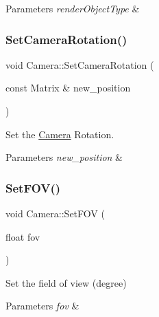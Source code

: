 \begin{DoxyParams}{Parameters}
{\em render\+Object\+Type} & \\
\hline
\end{DoxyParams}
\mbox{\label{classCamera_a148acfe88ccb73ba5b658cd2e19ee244}} 
\subsubsection{\texorpdfstring{Set\+Camera\+Rotation()}{SetCameraRotation()}}
{\footnotesize\ttfamily void Camera\+::\+Set\+Camera\+Rotation (\begin{DoxyParamCaption}\item[{const Matrix \&}]{new\+\_\+position }\end{DoxyParamCaption})}



Set the \hyperlink{classCamera}{Camera} Rotation. 


\begin{DoxyParams}{Parameters}
{\em new\+\_\+position} & \\
\hline
\end{DoxyParams}
\mbox{\label{classCamera_aea06aa6e65a320393f703378f46ba40f}} 
\subsubsection{\texorpdfstring{Set\+F\+O\+V()}{SetFOV()}}
{\footnotesize\ttfamily void Camera\+::\+Set\+F\+OV (\begin{DoxyParamCaption}\item[{float}]{fov }\end{DoxyParamCaption})}



Set the field of view (degree) 


\begin{DoxyParams}{Parameters}
{\em fov} & \\
\hline
\end{DoxyParams}
\mbox{\label{classCamera_a71d00531ecb1f5cd9f3402bc3f1a4f30}} 
